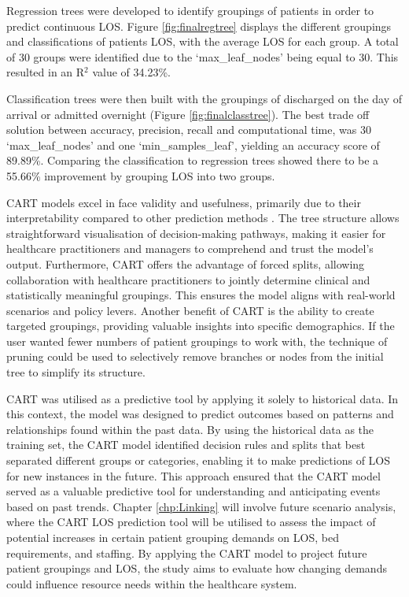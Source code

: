 \documentclass[../thesis.tex]{subfiles}
\begin{document}
Regression trees were developed to identify groupings of patients in order to predict continuous LOS. Figure \ref{fig:finalregtree} displays the different groupings and classifications of patients LOS, with the average LOS for each group. A total of 30 groups were identified due to the `max\_leaf\_nodes' being equal to 30. This resulted in an R$^{2}$ value of 34.23\%.

Classification trees were then built with the groupings of discharged on the day of arrival or admitted overnight (Figure \ref{fig:finalclasstree}). The best trade off solution between accuracy, precision, recall and computational time, was 30 `max\_leaf\_nodes' and one `min\_samples\_leaf', yielding an accuracy score of 89.89\%. Comparing the classification to regression trees showed there to be a 55.66\% improvement by grouping LOS into two groups.

CART models excel in face validity and usefulness, primarily due to their interpretability compared to other prediction methods \cite{Harper2005, Harper2005b}. The tree structure allows straightforward visualisation of decision-making pathways, making it easier for healthcare practitioners and managers to comprehend and trust the model's output. Furthermore, CART offers the advantage of forced splits, allowing collaboration with healthcare practitioners to jointly determine clinical and statistically meaningful groupings. This ensures the model aligns with real-world scenarios and policy levers. Another benefit of CART is the ability to create targeted groupings, providing valuable insights into specific demographics. If the user wanted fewer numbers of patient groupings to work with, the technique of pruning could be used to selectively remove branches or nodes from the initial tree to simplify its structure.

CART was utilised as a predictive tool by applying it solely to historical data. In this context, the model was designed to predict outcomes based on patterns and relationships found within the past data. By using the historical data as the training set, the CART model identified decision rules and splits that best separated different groups or categories, enabling it to make predictions of LOS for new instances in the future. This approach ensured that the CART model served as a valuable predictive tool for understanding and anticipating events based on past trends. Chapter \ref{chp:Linking} will involve future scenario analysis, where the CART LOS prediction tool will be utilised to assess the impact of potential increases in certain patient grouping demands on LOS, bed requirements, and staffing. By applying the CART model to project future patient groupings and LOS, the study aims to evaluate how changing demands could influence resource needs within the healthcare system.
\end{document}
